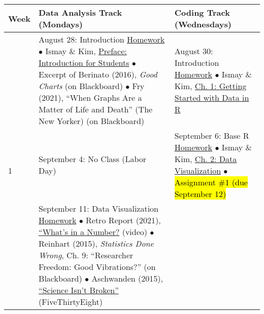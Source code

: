 \documentclass[12pt,letterpaper]{article}
\begin{document}
\begin{tabularx}{\textwidth}{|p{}|p{}||p{}|}
\hline
\textbf{Week} & \textbf{Data Analysis Track (Mondays)} & \textbf{Coding Track (Wednesdays)} \\


\hline
\multirow{10}{*}{1} &

August 28: Introduction \newline \newline
\ul{Homework} \newline
$\bullet$ Ismay \& Kim, \href{https://moderndive.com/preface.html#introduction-for-students}{Preface: Introduction for Students} \newline
$\bullet$ Excerpt of Berinato (2016), \emph{Good Charts} (on Blackboard) \newline
$\bullet$ Fry (2021), ``When Graphs Are a Matter of Life and Death'' (The New Yorker) (on Blackboard) &

August 30: Introduction \newline \newline
\ul{Homework} \newline
$\bullet$ Ismay \& Kim, \href{https://moderndive.com/1-getting-started.html}{Ch. 1: Getting Started with Data in R} \\


\hline
\multirow{6}{*}{2} &

September 4: No Class (Labor Day) &

September 6: Base R \newline \newline
\ul{Homework} \newline
$\bullet$ Ismay \& Kim, \href{https://moderndive.com/2-viz.html}{Ch. 2: Data Visualization} \newline
$\bullet$ \hl{Assignment \#1 (due September 12)} \\


\hline
\multirow{10}{*}{3} &

September 11: Data Visualization \newline \newline
\ul{Homework} \newline
$\bullet$ Retro Report (2021), \href{https://www.retroreport.org/video/research-challenges-idea-that-lower-bmi-is-always-better/}{``What's in a Number?} (video) \newline
$\bullet$ Reinhart (2015), \emph{Statistics Done Wrong}, Ch. 9: ``Researcher Freedom: Good Vibrations?'' (on Blackboard) \newline
$\bullet$ Aschwanden (2015), \href{https://fivethirtyeight.com/features/science-isnt-broken/}{``Science Isn't Broken''} (FiveThirtyEight) &


\end{tabularx}
\end{document}
